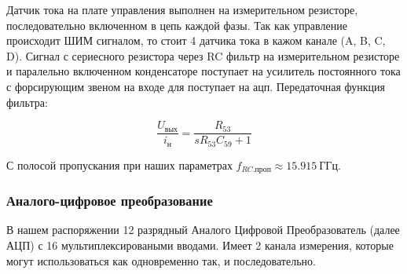 Датчик тока на плате управления выполнен на измерительном резисторе, последовательно
включенном в цепь каждой фазы. Так как управление происходит ШИМ сигналом, то стоит 4
датчика тока в кажом канале (A, B, C, D).
Сигнал с сериесного резистора через RC фильтр на измерительном резисторе и паралельно включенном
конденсаторе поступает на усилитель постоянного тока с форсирующим звеном на входе для поступает на ацп.
Передаточная функция фильтра:

$$
    \frac{ U_\text{вых} }{ i_\text{н} } = \frac{ R_{53} }{ s R_{53} C_{59} + 1 }
$$

С полосой пропускания при наших параметрах $f_{RC.\text{проп} } \approx 15.915 ~\text{ГГц}$.

\subsubsection{ Аналого-цифровое преобразование }
В нашем распоряжении 12 разрядный Аналого Цифровой Преобразователь (далее АЦП) с 16
мультиплексироваными вводами.
Имеет 2 канала измерения, которые могут использоваться как одновременно так, и последовательно.

